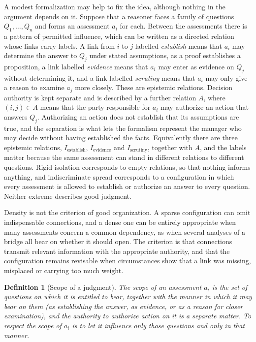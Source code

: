 \documentclass[12pt, a4paper]{article}
\newtheorem{definition}{Definition}
\begin{document}
A modest formalization may help to fix the idea, although nothing in the argument depends on it. Suppose that a reasoner faces a family of questions $Q_1,\dots,Q_n$ and forms an assessment $a_i$ for each. Between the assessments there is a pattern of permitted influence, which can be written as a directed relation whose links carry labels. A link from $i$ to $j$ labelled \emph{establish} means that $a_i$ may determine the answer to $Q_j$ under stated assumptions, as a proof establishes a proposition, a link labelled \emph{evidence} means that $a_i$ may enter as evidence on $Q_j$ without determining it, and a link labelled \emph{scrutiny} means that $a_i$ may only give a reason to examine $a_j$ more closely. These are epistemic relations. Decision authority is kept separate and is described by a further relation $A$, where $(i,j)\in A$ means that the party responsible for $a_i$ may authorize an action that answers $Q_j$. Authorizing an action does not establish that its assumptions are true, and the separation is what lets the formalism represent the manager who may decide without having established the facts. Equivalently there are three epistemic relations, $I_{\mathrm{establish}}$, $I_{\mathrm{evidence}}$ and $I_{\mathrm{scrutiny}}$, together with $A$, and the labels matter because the same assessment can stand in different relations to different questions. Rigid isolation corresponds to empty relations, so that nothing informs anything, and indiscriminate spread corresponds to a configuration in which every assessment is allowed to establish or authorize an answer to every question. Neither extreme describes good judgment.

Density is not the criterion of good organization. A sparse configuration can omit indispensable connections, and a dense one can be entirely appropriate when many assessments concern a common dependency, as when several analyses of a bridge all bear on whether it should open. The criterion is that connections transmit relevant information with the appropriate authority, and that the configuration remains revisable when circumstances show that a link was missing, misplaced or carrying too much weight.

\begin{definition}[Scope of a judgment]
The \emph{scope} of an assessment $a_i$ is the set of questions on which it is entitled to bear, together with the manner in which it may bear on them (as establishing the answer, as evidence, or as a reason for closer examination), and the authority to authorize action on it is a separate matter. To \emph{respect} the scope of $a_i$ is to let it influence only those questions and only in that manner.
\end{definition}
\end{document}
